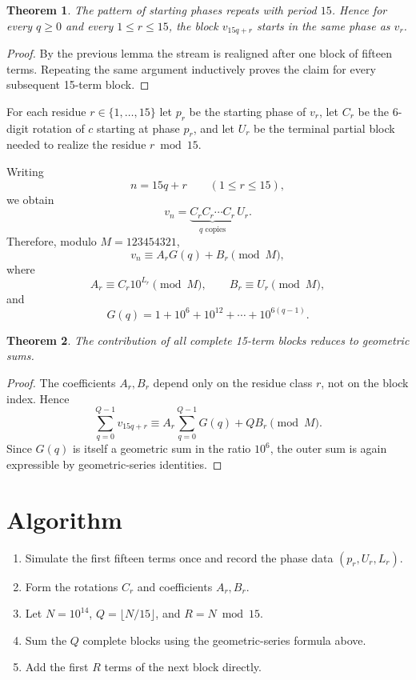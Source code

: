 \documentclass[11pt]{article}
\newtheorem{theorem}{Theorem}
\begin{document}
\begin{theorem}
The pattern of starting phases repeats with period $15$. Hence for every $q \ge 0$ and every $1 \le r \le 15$, the block $v_{15q+r}$ starts in the same phase as $v_r$.
\end{theorem}

\begin{proof}
By the previous lemma the stream is realigned after one block of fifteen terms. Repeating the same argument inductively proves the claim for every subsequent 15-term block.
\end{proof}

For each residue $r \in \{1,\dots,15\}$ let $p_r$ be the starting phase of $v_r$, let $C_r$ be the 6-digit rotation of $c$ starting at phase $p_r$, and let $U_r$ be the terminal partial block needed to realize the residue $r \bmod 15$.

Writing
\[
n=15q+r \qquad (1 \le r \le 15),
\]
we obtain
\[
v_n = \underbrace{C_r C_r \cdots C_r}_{q\text{ copies}}\, U_r.
\]
Therefore, modulo $M=123454321$,
\[
v_n \equiv A_r G(q) + B_r \pmod M,
\]
where
\[
A_r \equiv C_r 10^{L_r} \pmod M,\qquad B_r \equiv U_r \pmod M,
\]
and
\[
G(q)=1+10^6+10^{12}+\cdots+10^{6(q-1)}.
\]

\begin{theorem}
The contribution of all complete 15-term blocks reduces to geometric sums.
\end{theorem}

\begin{proof}
The coefficients $A_r,B_r$ depend only on the residue class $r$, not on the block index. Hence
\[
\sum_{q=0}^{Q-1} v_{15q+r}
\equiv
A_r \sum_{q=0}^{Q-1} G(q) + Q B_r \pmod M.
\]
Since $G(q)$ is itself a geometric sum in the ratio $10^6$, the outer sum is again expressible by geometric-series identities.
\end{proof}

\section{Algorithm}

\begin{enumerate}
\item Simulate the first fifteen terms once and record the phase data $(p_r,U_r,L_r)$.
\item Form the rotations $C_r$ and coefficients $A_r,B_r$.
\item Let $N=10^{14}$, $Q=\lfloor N/15 \rfloor$, and $R=N \bmod 15$.
\item Sum the $Q$ complete blocks using the geometric-series formula above.
\item Add the first $R$ terms of the next block directly.
\end{enumerate}
\end{document}
